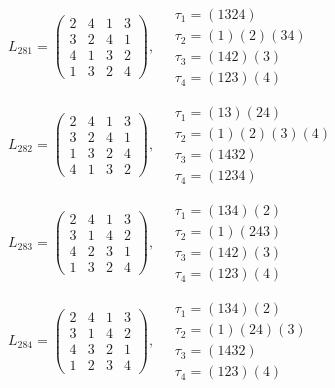 $L_{281} = \begin{pmatrix} 2 & 4 & 1 & 3 \\ 3 & 2 & 4 & 1 \\ 4 & 1 & 3 & 2 \\ 1 & 3 & 2 & 4 \end{pmatrix}, \quad \begin{matrix} \tau_{1} = (1 3 2 4) \\ \tau_{2} = (1)(2)(3 4) \\ \tau_{3} = (1 4 2)(3) \\ \tau_{4} = (1 2 3)(4) \end{matrix}$

$L_{282} = \begin{pmatrix} 2 & 4 & 1 & 3 \\ 3 & 2 & 4 & 1 \\ 1 & 3 & 2 & 4 \\ 4 & 1 & 3 & 2 \end{pmatrix}, \quad \begin{matrix} \tau_{1} = (1 3)(2 4) \\ \tau_{2} = (1)(2)(3)(4) \\ \tau_{3} = (1 4 3 2) \\ \tau_{4} = (1 2 3 4) \end{matrix}$

$L_{283} = \begin{pmatrix} 2 & 4 & 1 & 3 \\ 3 & 1 & 4 & 2 \\ 4 & 2 & 3 & 1 \\ 1 & 3 & 2 & 4 \end{pmatrix}, \quad \begin{matrix} \tau_{1} = (1 3 4)(2) \\ \tau_{2} = (1)(2 4 3) \\ \tau_{3} = (1 4 2)(3) \\ \tau_{4} = (1 2 3)(4) \end{matrix}$

$L_{284} = \begin{pmatrix} 2 & 4 & 1 & 3 \\ 3 & 1 & 4 & 2 \\ 4 & 3 & 2 & 1 \\ 1 & 2 & 3 & 4 \end{pmatrix}, \quad \begin{matrix} \tau_{1} = (1 3 4)(2) \\ \tau_{2} = (1)(2 4)(3) \\ \tau_{3} = (1 4 3 2) \\ \tau_{4} = (1 2 3)(4) \end{matrix}$

